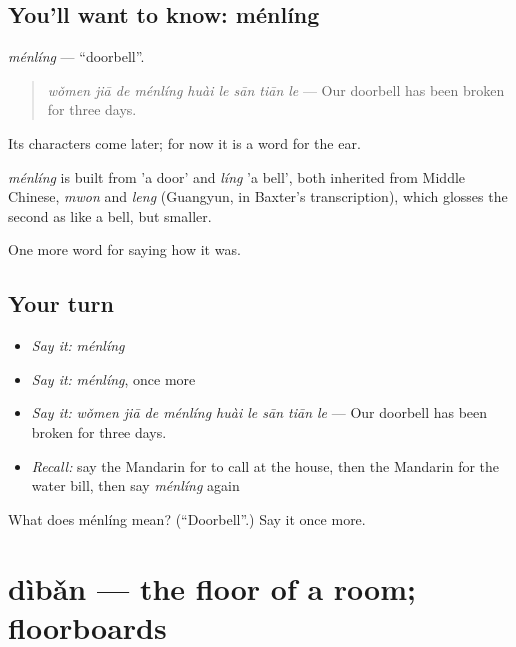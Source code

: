 \subsection*{You'll want to know: ménlíng}
\emph{ménlíng} — \textquotedblleft{}doorbell\textquotedblright{}.

\begin{quote}
\emph{wǒmen jiā de ménlíng huài le sān tiān le} — Our doorbell has been broken for three days.
\end{quote}

Its characters come later; for now it is a word for the ear.

\begin{cousinweb}
\emph{ménlíng} is built from  'a door' and \emph{líng} 'a bell', both inherited from Middle Chinese, \emph{mwon} and \emph{leng} (Guangyun, in Baxter's transcription), which glosses the second as like a bell, but smaller.
\end{cousinweb}

\begin{grammarlens}[title={What you've built}]
One more word for saying how it was.
\end{grammarlens}

\subsection*{Your turn}
\begin{itemize}
\raggedright
  \item \emph{Say it:} \emph{ménlíng}
  \item \emph{Say it:} \emph{ménlíng}, once more
  \item \emph{Say it:} \emph{wǒmen jiā de ménlíng huài le sān tiān le} — Our doorbell has been broken for three days.
  \item \emph{Recall:} say the Mandarin for to call at the house, then the Mandarin for the water bill, then say \emph{ménlíng} again
\end{itemize}

\begin{tcolorbox}[breakable,colback=teal!4,colframe=teal!35!black,title={Before you move on}]
What does ménlíng mean? (\textquotedblleft{}Doorbell\textquotedblright{}.) Say it once more.
\end{tcolorbox}
\section[dìbǎn]{dìbǎn — the floor of a room; floorboards}

